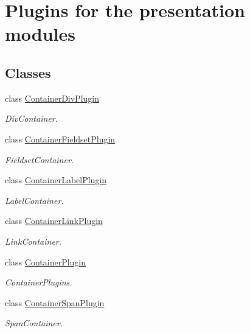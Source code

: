 \section{Plugins for the presentation modules}
\label{group__OWL__UI__PLUGINS}
\subsection*{Classes}
\begin{DoxyCompactItemize}
\item 
class \hyperlink{classContainerDivPlugin}{ContainerDivPlugin}
\begin{DoxyCompactList}\small\item\em DivContainer. \item\end{DoxyCompactList}\item 
class \hyperlink{classContainerFieldsetPlugin}{ContainerFieldsetPlugin}
\begin{DoxyCompactList}\small\item\em FieldsetContainer. \item\end{DoxyCompactList}\item 
class \hyperlink{classContainerLabelPlugin}{ContainerLabelPlugin}
\begin{DoxyCompactList}\small\item\em LabelContainer. \item\end{DoxyCompactList}\item 
class \hyperlink{classContainerLinkPlugin}{ContainerLinkPlugin}
\begin{DoxyCompactList}\small\item\em LinkContainer. \item\end{DoxyCompactList}\item 
class \hyperlink{classContainerPlugin}{ContainerPlugin}
\begin{DoxyCompactList}\small\item\em ContainerPlugins. \item\end{DoxyCompactList}\item 
class \hyperlink{classContainerSpanPlugin}{ContainerSpanPlugin}
\begin{DoxyCompactList}\small\item\em SpanContainer. \item\end{DoxyCompactList}\end{DoxyCompactItemize}
